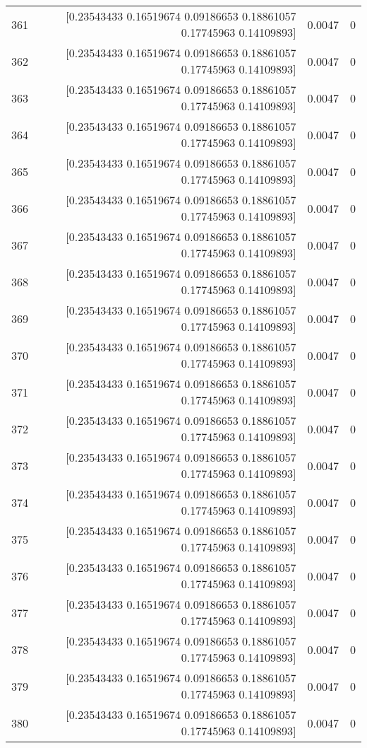 \begin{longtable}{lrrr}
361 & [0.23543433 0.16519674 0.09186653 0.18861057 0.17745963 0.14109893] & 0.0047 & 0 \\
362 & [0.23543433 0.16519674 0.09186653 0.18861057 0.17745963 0.14109893] & 0.0047 & 0 \\
363 & [0.23543433 0.16519674 0.09186653 0.18861057 0.17745963 0.14109893] & 0.0047 & 0 \\
364 & [0.23543433 0.16519674 0.09186653 0.18861057 0.17745963 0.14109893] & 0.0047 & 0 \\
365 & [0.23543433 0.16519674 0.09186653 0.18861057 0.17745963 0.14109893] & 0.0047 & 0 \\
366 & [0.23543433 0.16519674 0.09186653 0.18861057 0.17745963 0.14109893] & 0.0047 & 0 \\
367 & [0.23543433 0.16519674 0.09186653 0.18861057 0.17745963 0.14109893] & 0.0047 & 0 \\
368 & [0.23543433 0.16519674 0.09186653 0.18861057 0.17745963 0.14109893] & 0.0047 & 0 \\
369 & [0.23543433 0.16519674 0.09186653 0.18861057 0.17745963 0.14109893] & 0.0047 & 0 \\
370 & [0.23543433 0.16519674 0.09186653 0.18861057 0.17745963 0.14109893] & 0.0047 & 0 \\
371 & [0.23543433 0.16519674 0.09186653 0.18861057 0.17745963 0.14109893] & 0.0047 & 0 \\
372 & [0.23543433 0.16519674 0.09186653 0.18861057 0.17745963 0.14109893] & 0.0047 & 0 \\
373 & [0.23543433 0.16519674 0.09186653 0.18861057 0.17745963 0.14109893] & 0.0047 & 0 \\
374 & [0.23543433 0.16519674 0.09186653 0.18861057 0.17745963 0.14109893] & 0.0047 & 0 \\
375 & [0.23543433 0.16519674 0.09186653 0.18861057 0.17745963 0.14109893] & 0.0047 & 0 \\
376 & [0.23543433 0.16519674 0.09186653 0.18861057 0.17745963 0.14109893] & 0.0047 & 0 \\
377 & [0.23543433 0.16519674 0.09186653 0.18861057 0.17745963 0.14109893] & 0.0047 & 0 \\
378 & [0.23543433 0.16519674 0.09186653 0.18861057 0.17745963 0.14109893] & 0.0047 & 0 \\
379 & [0.23543433 0.16519674 0.09186653 0.18861057 0.17745963 0.14109893] & 0.0047 & 0 \\
380 & [0.23543433 0.16519674 0.09186653 0.18861057 0.17745963 0.14109893] & 0.0047 & 0 \\

\end{longtable}
